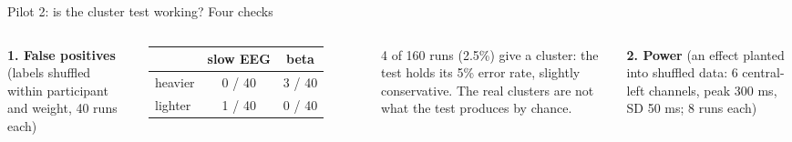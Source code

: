 \documentclass[aspectratio=169,10pt]{beamer}
\begin{document}
\begin{frame}{Pilot 2: is the cluster test working? Four checks}
  \begin{columns}[T]
    \textbf{1. False positives} (labels shuffled within participant and weight, 40 runs each)

    \smallskip
    \centering\scriptsize
    \begin{tabular}{lcc}
      \toprule
      & slow EEG & beta \\
      \midrule
      heavier & 0 / 40 & 3 / 40 \\
      lighter & 1 / 40 & 0 / 40 \\
      \bottomrule
    \end{tabular}
    \raggedright

    {\scriptsize 4 of 160 runs (2.5\%) give a cluster: the test holds its 5\% error rate, slightly conservative. The
    real clusters are not what the test produces by chance.\par}

    \medskip
    \textbf{2. Power} (an effect planted into shuffled data: 6 central-left channels, peak 300 ms, SD 50 ms; 8 runs each)


\end{columns}
\end{frame}
\end{document}
